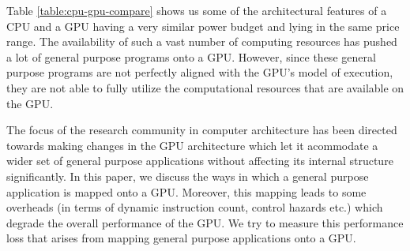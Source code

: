 \par{
	Table \ref{table:cpu-gpu-compare} shows us some of the architectural features of a CPU and a GPU having a very similar power budget and lying in the same price range. The availability of such a vast number of computing resources has pushed a lot of general purpose programs onto a GPU. However, since these general purpose programs are not perfectly aligned with the GPU's model of execution, they are not able to fully utilize the computational resources that are available on the GPU.
}

\par{The focus of the research community in computer architecture has been directed towards making changes in the GPU architecture which let it acommodate a wider set of general purpose applications without affecting its internal structure significantly. In this paper, we discuss the ways in which a general purpose application is mapped onto a GPU. Moreover, this mapping leads to some overheads (in terms of dynamic instruction count, control hazards etc.) which degrade the overall performance of the GPU. We try to measure this performance loss that arises from mapping general purpose applications onto a GPU.
}
